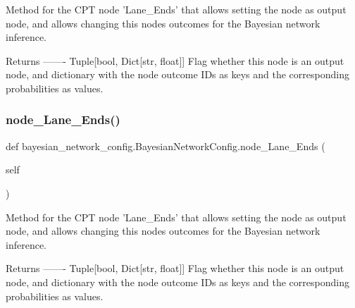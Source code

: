 \begin{DoxyVerb}Method for the CPT node 'Lane_Ends' that allows setting the node as output node, 
and allows changing this nodes outcomes for the Bayesian network inference.

Returns
-------
Tuple[bool, Dict[str, float]]
    Flag whether this node is an output node, and dictionary with the node outcome IDs as keys 
    and the corresponding probabilities as values.
\end{DoxyVerb}
 \mbox{\label{classbayesian__network__config_1_1_bayesian_network_config_a9a6e2aefc96155fcdd4a825b1defbe76}} 
\subsubsection{\texorpdfstring{node\+\_\+\+Lane\+\_\+\+Ends()}{node\_Lane\_Ends()}\hspace{0.1cm}{\footnotesize\ttfamily [2/2]}}
{\footnotesize\ttfamily def bayesian\+\_\+network\+\_\+config.\+Bayesian\+Network\+Config.\+node\+\_\+\+Lane\+\_\+\+Ends (\begin{DoxyParamCaption}\item[{}]{self }\end{DoxyParamCaption})}

\begin{DoxyVerb}Method for the CPT node 'Lane_Ends' that allows setting the node as output node, 
and allows changing this nodes outcomes for the Bayesian network inference.

Returns
-------
Tuple[bool, Dict[str, float]]
    Flag whether this node is an output node, and dictionary with the node outcome IDs as keys 
    and the corresponding probabilities as values.
\end{DoxyVerb}
 \mbox{\label{classbayesian__network__config_1_1_bayesian_network_config_a0aff21732724921c5b734e4cc2128711}} 
